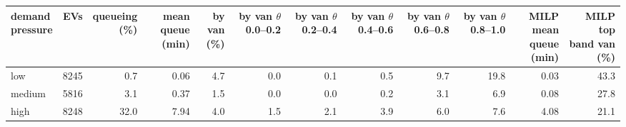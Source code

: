 \begin{tabular}{@{}lrrrrrrrrrrr@{}}
\toprule
\shortstack[l]{demand\\pressure} & EVs & \shortstack[r]{queueing\\(\%)} & \shortstack[r]{mean queue\\(min)} & \shortstack[r]{by van\\(\%)} & \shortstack[r]{by van\\$\theta$ 0.0--0.2} & \shortstack[r]{by van\\$\theta$ 0.2--0.4} & \shortstack[r]{by van\\$\theta$ 0.4--0.6} & \shortstack[r]{by van\\$\theta$ 0.6--0.8} & \shortstack[r]{by van\\$\theta$ 0.8--1.0} & \shortstack[r]{MILP mean\\queue (min)} & \shortstack[r]{MILP top\\band van (\%)} \\
\midrule
low & 8245 & 0.7 & 0.06 & 4.7 & 0.0 & 0.1 & 0.5 & 9.7 & 19.8 & 0.03 & 43.3 \\
medium & 5816 & 3.1 & 0.37 & 1.5 & 0.0 & 0.0 & 0.2 & 3.1 & 6.9 & 0.08 & 27.8 \\
high & 8248 & 32.0 & 7.94 & 4.0 & 1.5 & 2.1 & 3.9 & 6.0 & 7.6 & 4.08 & 21.1 \\
\bottomrule
\end{tabular}
